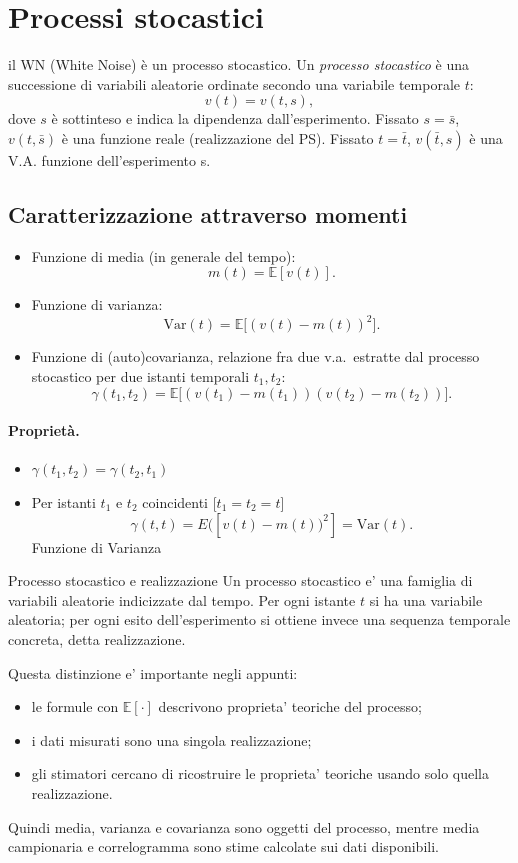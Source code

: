 \documentclass[11pt,a4paper]{article}
\begin{document}
\section{Processi stocastici}
il WN (White Noise) è un processo stocastico.
Un \emph{processo stocastico} è una successione di variabili aleatorie ordinate secondo una variabile temporale $t$:
\[
v(t)=v(t,s),
\]
dove $s$ è sottinteso e indica la dipendenza dall'esperimento. Fissato $s=\bar s$, $v(t,\bar s)$ è una funzione reale (realizzazione del PS). Fissato $t=\bar t$, $v(\bar t,s)$ è una V.A. funzione dell'esperimento s.

\subsection{Caratterizzazione attraverso momenti}
\begin{itemize}
  \item Funzione di media (in generale del tempo):
  \[m(t)=\mathbb{E}[v(t)].\]
  \item Funzione di varianza:
  \[\mathrm{Var}(t)=\mathbb{E}\bigl[(v(t)-m(t))^2\bigr].\]
  \item Funzione di (auto)covarianza, relazione fra due v.a.\ estratte dal processo stocastico per due istanti temporali $t_1,t_2$:
  \[\gamma(t_1,t_2)=\mathbb{E}\bigl[(v(t_1)-m(t_1))(v(t_2)-m(t_2))\bigr].\]
\end{itemize}

\paragraph{Proprietà.}
\begin{itemize}
    \item $\gamma(t_1,t_2)=\gamma(t_2,t_1)$
    \item Per istanti $t_1$ e $t_2$ coincidenti [$t_1 = t_2 = t$] 
    \[\gamma(t,t)=E([v(t)-m(t))^2] = \mathrm{Var}(t).\]  Funzione di Varianza
\end{itemize}


\begin{spiegazione}{Processo stocastico e realizzazione}
Un processo stocastico e' una famiglia di variabili aleatorie indicizzate dal tempo. Per ogni istante $t$ si ha una variabile aleatoria; per ogni esito dell'esperimento si ottiene invece una sequenza temporale concreta, detta realizzazione.

Questa distinzione e' importante negli appunti:
\begin{itemize}
  \item le formule con $\mathbb E[\cdot]$ descrivono proprieta' teoriche del processo;
  \item i dati misurati sono una singola realizzazione;
  \item gli stimatori cercano di ricostruire le proprieta' teoriche usando solo quella realizzazione.
\end{itemize}
Quindi media, varianza e covarianza sono oggetti del processo, mentre media campionaria e correlogramma sono stime calcolate sui dati disponibili.
\end{spiegazione}
\end{document}
